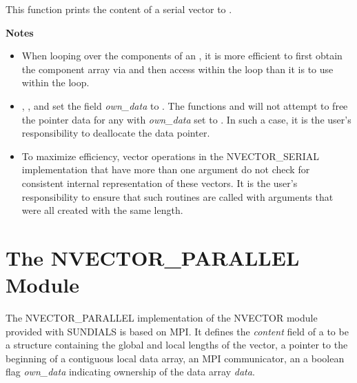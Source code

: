 \documentclass[letterpaper,10pt,english]{sphinxmanual}
\begin{document}
\begin{fulllineitems}
\label{nvectors/NVector_Serial:N_VPrint_Serial}
This function prints the content of a serial vector to .

\end{fulllineitems}


\textbf{Notes}
\begin{itemize}
\item {} 
When looping over the components of an , it is more
efficient to first obtain the component array via  and then access  within the loop than it
is to use  within the loop.

\item {} 
{\hyperref[nvectors/NVector_Serial:N_VNewEmpty_Serial]{}}, {\hyperref[nvectors/NVector_Serial:N_VMake_Serial]{}}, and
{\hyperref[nvectors/NVector_Serial:N_VCloneEmptyVectorArray_Serial]{}} set the field \emph{own\_data}
to .  The functions  and
{\hyperref[nvectors/NVector_Serial:N_VDestroyVectorArray_Serial]{}} will not attempt to free the
pointer data for any  with \emph{own\_data} set to .
In such a case, it is the user's responsibility to deallocate the
data pointer.

\item {} 
To maximize efficiency, vector operations in the NVECTOR\_SERIAL
implementation that have more than one  argument do not
check for consistent internal representation of these vectors. It is
the user's responsibility to ensure that such routines are called
with  arguments that were all created with the same
length.

\end{itemize}


\section{The NVECTOR\_PARALLEL Module}
\label{nvectors/NVector_Parallel:nvectors-nvparallel}\label{nvectors/NVector_Parallel:the-nvector-parallel-module}\label{nvectors/NVector_Parallel::doc}
The NVECTOR\_PARALLEL implementation of the NVECTOR module provided with
SUNDIALS is based on MPI.  It defines the \emph{content} field of a
 to be a structure containing the global and local lengths
of the vector, a pointer to the beginning of a contiguous local data
array, an MPI communicator, an a boolean flag \emph{own\_data} indicating
ownership of the data array \emph{data}.
\end{document}
